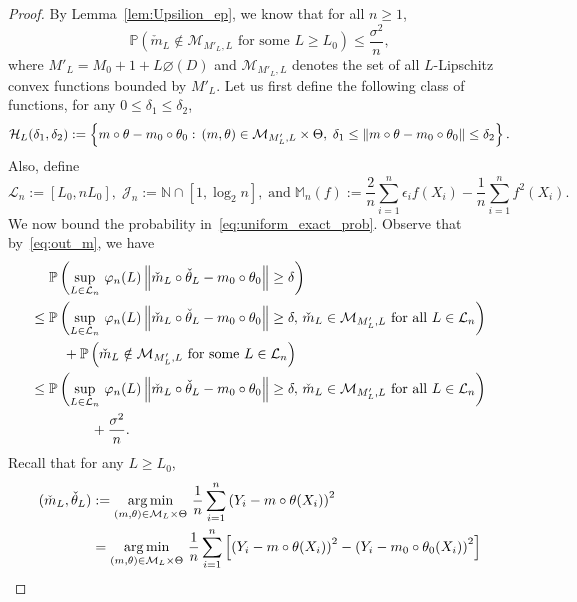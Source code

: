 \begin{proof}
By Lemma~\ref{lem:Upsilion_ep}, we know that for all $n\ge 1$,
\begin{equation}\label{eq:out_m}
\mathbb{P}\left(\check{m}_L\notin \mathcal{M}_{M'_L, L}\mbox{ for some }L \ge L_0\right) \le \frac{\sigma^2}{n},
\end{equation}
where $M'_L = M_0 + 1 + L\diameter(D)$ and $\mathcal{M}_{M'_L, L}$ denotes the set of all $L$-Lipschitz convex functions bounded by $M'_L$.
Let us first define the following class of functions, for any  $0 \le \delta_1 \le \delta_2$,
\[
\mathcal{H}_{L}(\delta_1, \delta_2) := \left\{m\circ\theta - m_0\circ\theta_0:\,(m,\theta)\in\mathcal{M}_{M'_L, L}\times\Theta,\;\delta_1 \le \left\lVert m\circ\theta - m_0\circ\theta_0\right\rVert \le \delta_2\right\}.
\]
Also, define
\begin{equation}\label{eq:L_J_M_def}
\mathcal{L}_n := [L_0, nL_0], \; \mathcal{J}_n := \mathbb{N}\cap [1, \log_2 n], \;\text{and}\;  \mathbb{M}_n(f) := \frac{2}{n}\sum_{i=1}^n \epsilon_if(X_i) - \frac{1}{n}\sum_{i=1}^n f^2(X_i).
\end{equation}
We now bound the probability in~\eqref{eq:uniform_exact_prob}. Observe that by~\eqref{eq:out_m}, we have
\begin{align}
&\mathbb{P}\left(\sup_{L\in\mathcal{L}_n}\,\varphi_n(L)\left\lVert\check{m}_L\circ\check{\theta}_L - m_0\circ\theta_0\right\rVert \ge \delta\right)\nonumber\\
\le{}& \mathbb{P}\left(\sup_{L\in\mathcal{L}_n}\,\varphi_n(L)\left\lVert\check{m}_L\circ\check{\theta}_L - m_0\circ\theta_0\right\rVert \ge \delta,\,\check{m}_L\in\mathcal{M}_{M'_L, L}\mbox{ for all }L\in\mathcal{L}_n\right)\nonumber\\
&\quad+\mathbb{P}\left(\check{m}_L\notin\mathcal{M}_{M'_L, L}\mbox{ for some }L\in\mathcal{L}_n\right)\nonumber\\
\le{}& \mathbb{P}\left(\sup_{L\in\mathcal{L}_n}\,\varphi_n(L)\left\lVert\check{m}_L\circ\check{\theta}_L - m_0\circ\theta_0\right\rVert \ge \delta,\,\check{m}_L\in\mathcal{M}_{M'_L, L}\mbox{ for all }L\in\mathcal{L}_n\right)\nonumber\\
&\qquad\quad + \frac{\sigma^2}{n}.\label{eq:first_split}
\end{align}
Recall that for any $L \ge L_0$, 
\begin{align*}
(\check{m}_L, \check{\theta}_L) &:= \argmin_{(m,\theta)\in\mathcal{M}_L\times\Theta}\,\frac{1}{n}\sum_{i=1}^n \left(Y_i - m\circ\theta(X_i)\right)^2\\
&= \argmin_{(m,\theta)\in\mathcal{M}_L\times\Theta}\,\frac{1}{n}\sum_{i=1}^n \left[\left(Y_i - m\circ\theta(X_i)\right)^2 - \left(Y_i - m_0\circ\theta_0(X_i)\right)^2\right]\\

\end{align*}
\end{proof}
